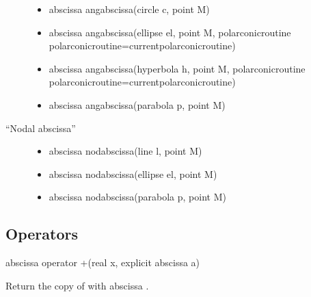 \documentclass[pdftex]{article}
\begin{document}
\begin{description}
  \begin{itemize}
  \item {}
    \begin{Vcolor}
      abscissa angabscissa(circle c, point M)
    \end{Vcolor}
  \item {}
    \begin{Vcolor}
      abscissa angabscissa(ellipse el, point M, polarconicroutine
      polarconicroutine=currentpolarconicroutine)
    \end{Vcolor}
  \item {}
    \begin{Vcolor}
      abscissa angabscissa(hyperbola h, point M, polarconicroutine
      polarconicroutine=currentpolarconicroutine)
    \end{Vcolor}
  \item {}
    \begin{Vcolor}
      abscissa angabscissa(parabola p, point M)
    \end{Vcolor}
  \end{itemize}
\item[``Nodal abscissa'']\hspace*{0mm}
  \begin{itemize}
  \item {}
    \begin{Vcolor}
      abscissa nodabscissa(line l, point M)
    \end{Vcolor}
  \item {}
    \begin{Vcolor}
      abscissa nodabscissa(ellipse el, point M)
    \end{Vcolor}
  \item {}
    \begin{Vcolor}
      abscissa nodabscissa(parabola p, point M)
    \end{Vcolor}
  \end{itemize}
\end{description}

\subsection{Operators}
\begin{Vcolor}
  abscissa operator +(real x, explicit abscissa a)
\end{Vcolor}
Return the copy of  with abscissa .
\end{document}
